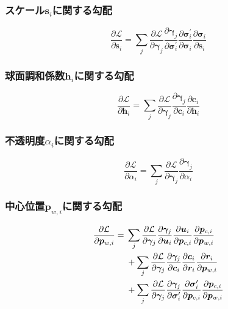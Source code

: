 \documentclass[dvipdfmx]{jlreq}
\begin{document}
\subsubsection*{スケール$\bm{s}_i$に関する勾配}
\begin{equation}
    \frac{\partial\mathcal{L}}{\partial\bm{s}_i}
    = \sum_j
    \frac{\partial\mathcal{L}}{\partial\bm{\gamma}_j}
    \frac{\partial\bm{\gamma}_j}{\partial\bm{\sigma}_i^{\prime}}
    \frac{\partial\bm{\sigma}_i^{\prime}}{\partial\bm{\sigma}_i}
    \frac{\partial\bm{\sigma}_i}{\partial\bm{s}_i}
    \label{eq:scale_gradient_chain}
\end{equation}

\subsubsection*{球面調和係数$\bm{h}_i$に関する勾配}
\begin{equation}
    \frac{\partial\mathcal{L}}{\partial\bm{h}_i}
    = \sum_j
    \frac{\partial\mathcal{L}}{\partial\bm{\gamma}_j}
    \frac{\partial\bm{\gamma}_j}{\partial\bm{c}_i}
    \frac{\partial\bm{c}_i}{\partial\bm{h}_i}
    \label{eq:sh_gradient_chain}
\end{equation}

\subsubsection*{不透明度$\alpha_i$に関する勾配}
\begin{equation}
    \frac{\partial\mathcal{L}}{\partial\alpha_i}
    = \sum_j
    \frac{\partial\mathcal{L}}{\partial\bm{\gamma}_j}
    \frac{\partial\bm{\gamma}_j}{\partial\alpha_i}
    \label{eq:opacity_gradient_chain}
\end{equation}

\subsubsection*{中心位置$\bm{p}_{w,i}$に関する勾配}
\begin{align}
    \frac{\partial\mathcal{L}}{\partial\bm{p}_{w,i}}
    ={}&
    \sum_j
    \frac{\partial\mathcal{L}}{\partial\bm{\gamma}_j}
    \frac{\partial\bm{\gamma}_j}{\partial\bm{u}_i}
    \frac{\partial\bm{u}_i}{\partial\bm{p}_{c,i}}
    \frac{\partial\bm{p}_{c,i}}{\partial\bm{p}_{w,i}}
    \notag\\
    &+
    \sum_j
    \frac{\partial\mathcal{L}}{\partial\bm{\gamma}_j}
    \frac{\partial\bm{\gamma}_j}{\partial\bm{c}_i}
    \frac{\partial\bm{c}_i}{\partial\bm{r}_i}
    \frac{\partial\bm{r}_i}{\partial\bm{p}_{w,i}}
    \notag\\
    &+
    \sum_j
    \frac{\partial\mathcal{L}}{\partial\bm{\gamma}_j}
    \frac{\partial\bm{\gamma}_j}{\partial\bm{\sigma}_i^{\prime}}
    \frac{\partial\bm{\sigma}_i^{\prime}}{\partial\bm{p}_{c,i}}
    \frac{\partial\bm{p}_{c,i}}{\partial\bm{p}_{w,i}}
    \label{eq:position_gradient_chain}
\end{align}
\end{document}
